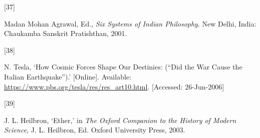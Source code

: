 \documentclass[
  12pt,
  british,
  a4paper,
]{article}
\newlength{\cslhangindent}
\newlength{\csllabelwidth}
\newenvironment{CSLReferences}[2] %
 {%
  \setlength{\parindent}{0pt}
  \ifodd #1 \everypar{\setlength{\hangindent}{\cslhangindent}}\ignorespaces\fi
  \ifnum #2 > 0
  \setlength{\parskip}{#2\baselineskip}
  \fi
 }%
 {}
\newcommand{\CSLLeftMargin}[1]{\parbox[t]{\csllabelwidth}{#1}}
\newcommand{\CSLRightInline}[1]{\parbox[t]{\linewidth - \csllabelwidth}{#1}\break}
\begin{document}
\begin{CSLReferences}{0}{0}
\leavevmode{}%
\CSLLeftMargin{{[}37{]} }
\CSLRightInline{Madan Mohan Agrawal, Ed., \emph{{Six Systems of Indian
Philosophy}}. New Delhi, India: Chaukamba Sanskrit Pratishthan, 2001. }

\leavevmode{}%
\CSLLeftMargin{{[}38{]} }
\CSLRightInline{N. Tesla, {`{How Cosmic Forces Shape Our Destinies:
({``Did the War Cause the Italian Earthquake''})}.'} {[}Online{]}.
Available: \url{https://www.pbs.org/tesla/res/res_art10.html}.
{[}Accessed: 26-Jun-2006{]}}

\leavevmode{}%
\CSLLeftMargin{{[}39{]} }
\CSLRightInline{J. L. Heilbron, {`Ether,'} in \emph{{The Oxford
Companion to the History of Modern Science}}, J. L. Heilbron, Ed. Oxford
University Press, 2003. }

\end{CSLReferences}
\end{document}
